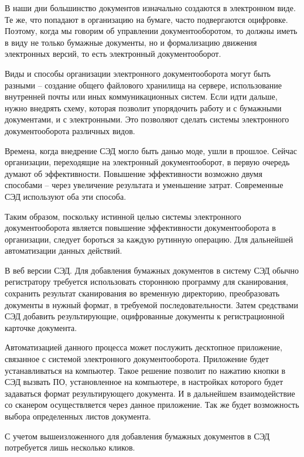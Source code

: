 
В наши дни большинство документов изначально создаются в электронном виде. Те же, что попадают в организацию на бумаге, часто подвергаются оцифровке. Поэтому, когда мы говорим об управлении документооборотом, то должны иметь в виду не только бумажные документы, но и формализацию движения электронных версий, то есть электронный документооборот. 

Виды и способы организации электронного документооборота могут быть разными – создание общего файлового хранилища на сервере, использование внутренней почты или иных коммуникационных систем. Если идти дальше, нужно внедрять схему, которая позволит упорядочить работу и с бумажными документами, и с электронными. Это позволяют сделать системы электронного документооборота различных видов.

Времена, когда внедрение СЭД могло быть данью моде, ушли в прошлое. Сейчас организации, переходящие на электронный документооборот, в первую очередь думают об эффективности. Повышение эффективности возможно двумя способами – через увеличение результата и уменьшение затрат. Современные СЭД используют оба эти способа.

Таким образом, поскольку истинной целью системы электронного документооборота является повышение эффективности документооборота в организации, следует бороться за каждую рутинную операцию. Для дальнейшей автоматизации данных действий.

В веб версии СЭД. Для добавления бумажных документов в систему СЭД обычно регистратору требуется использовать стороннюю программу для сканирования, сохранить результат сканирования во временную директорию, преобразовать документы в нужный формат, в требуемой последовательности. Затем средствами СЭД добавить результирующие, оцифрованные документы к регистрационной карточке документа.

Автоматизацией данного процесса может послужить десктопное приложение, связанное с системой электронного документооборота. Приложение будет устанавливаться на компьютер. Такое решение позволит по нажатию кнопки в СЭД вызвать ПО, установленное на компьютере, в настройках которого будет задаваться формат результирующего документа. И в дальнейшем взаимодействие со сканером осуществляется через данное приложение. Так же будет возможность выбора определенных листов документа.

С учетом вышеизложенного для добавления бумажных документов в СЭД потребуется лишь несколько кликов.